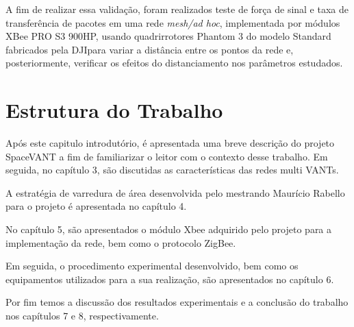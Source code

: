 A fim de realizar essa validação, foram realizados teste de força de sinal e taxa de transferência de pacotes em uma rede \emph{mesh/ad hoc}, implementada por módulos XBee PRO S3 900HP, usando quadrirrotores Phantom 3 do modelo Standard fabricados pela DJI\textregistered para variar a distância entre os pontos da rede e, posteriormente, verificar os efeitos do distanciamento nos parâmetros estudados.

\section{Estrutura do Trabalho}

Após este capitulo introdutório, é apresentada uma breve descrição do projeto SpaceVANT a fim de familiarizar o leitor com o contexto desse trabalho. Em seguida, no capítulo 3, são discutidas as características das redes multi VANTs. 

A estratégia de varredura de área desenvolvida pelo mestrando Maurício Rabello para o projeto é apresentada no capítulo 4. 

No capítulo 5, são apresentados o módulo Xbee adquirido pelo projeto para a implementação da rede, bem como o protocolo ZigBee. 

Em seguida, o procedimento experimental desenvolvido, bem como os equipamentos utilizados para a sua realização, são apresentados no capítulo 6.

Por fim temos a discussão dos resultados experimentais e a conclusão do trabalho nos capítulos 7 e 8, respectivamente.  